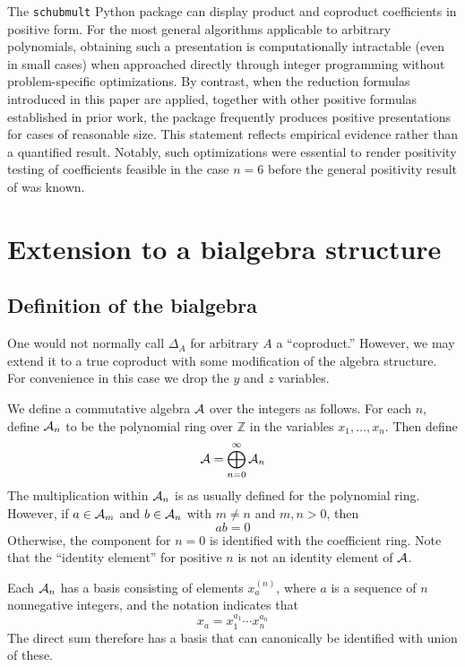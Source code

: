 \documentclass{amsart}
\theoremstyle{definition}
\theoremstyle{remark}
\numberwithin{equation}{subsection}
\begin{document}
The \verb|schubmult| Python package can display product and coproduct coefficients in positive form. For the most general algorithms applicable to arbitrary polynomials, obtaining such a presentation is computationally intractable (even in small cases) when approached directly through integer programming without problem-specific optimizations. By contrast, when the reduction formulas introduced in this paper are applied, together with other positive formulas established in prior work, the package frequently produces positive presentations for cases of reasonable size. This statement reflects empirical evidence rather than a quantified result. Notably, such optimizations were essential to render positivity testing of coefficients feasible in the case $n=6$ before the general positivity result of \cite{gao2025grahampositivitytripleschubert} was known.

\section{Extension to a bialgebra structure}

\subsection{Definition of the bialgebra}

One would not normally call $\Delta_A$ for arbitrary $A$ a ``coproduct.'' However, we may extend it to a true coproduct with some modification of the algebra structure. For convenience in this case we drop the $y$ and $z$ variables. 

We define a commutative algebra $\mathcal{A}$ over the integers as follows. For each $n$, define $\mathcal{A}_n$ to be the polynomial ring over $\mathbb{Z}$ in the variables $x_1,\ldots,x_n$. Then define
$$\mathcal{A} =\bigoplus_{n=0}^\infty \mathcal{A}_n$$
The multiplication within $\mathcal{A}_n$ is as usually defined for the polynomial ring. However, if $a\in \mathcal{A}_m$ and $b\in \mathcal{A}_n$ with $m\neq n$ and $m,n>0$,  then
$$ab = 0$$
Otherwise, the component for $n=0$ is identified with the coefficient ring. Note that the ``identity element'' for positive $n$ is not an identity element of $\mathcal{A}$.

Each $\mathcal{A}_n$ has a basis consisting of elements $x_a^{(n)}$, where $a$ is a sequence of $n$ nonnegative integers, and the notation indicates that
$$x_a = x_1^{a_1}\cdots x_n^{a_n}$$
The direct sum therefore has a basis that can canonically be identified with union of these.
\end{document}
